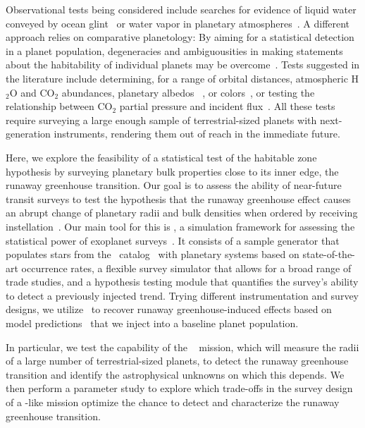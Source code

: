 \documentclass[twocolumn,twocolappendix]{aastex631}
\begin{document}
Observational tests being considered include searches for evidence of liquid water conveyed by ocean glint~\citep{Robinson2010,Lustig-Yaeger2018} or water vapor in planetary atmospheres~\citep{Suissa2020}.
A different approach relies on comparative planetology: By aiming for a statistical detection in a planet population, degeneracies and ambiguousities in making statements about the habitability of individual planets may be overcome~\citep{Checlair2019}.
Tests suggested in the literature include determining, for a range of orbital distances, atmospheric H$_{2}$O and CO$_2$ abundances, planetary albedos ~\citep{Bean2017,Bixel2021}, or colors~\citep{Crow2011}, or testing the relationship between CO$_2$ partial pressure and incident flux~\citep{Lehmer2020}.
All these tests require surveying a large enough sample of terrestrial-sized planets with next-generation instruments, rendering them out of reach in the immediate future.

Here, we explore the feasibility of a statistical test of the habitable zone hypothesis by surveying planetary bulk properties close to its inner edge, the runaway greenhouse transition.
Our goal is to assess the ability of near-future transit surveys to test the hypothesis that the runaway greenhouse effect causes an abrupt change of planetary radii and bulk densities when ordered by receiving instellation~\citep{Turbet2019}.
Our main tool for this is \bioverse, a simulation framework for assessing the statistical power of exoplanet surveys~\citep{Bixel2021}.
It consists of a sample generator that populates stars from the \gaia\ catalog~\citep{Gaia_mission,Gaia_DR3}  with planetary systems based on state-of-the-art occurrence rates, a flexible survey simulator that allows for a broad range of trade studies, and a hypothesis testing module that quantifies the survey's ability to detect a previously injected trend.
Trying different instrumentation and survey designs, we utilize \bioverse\ to recover runaway greenhouse-induced effects based on model predictions~\citep{Turbet2020,Dorn2021} that we inject into a baseline planet population.

In particular, we test the capability of the \plato\ \citep[PLAnetary Transits and Oscillation of stars, ][]{Rauer2016} mission, which will measure the radii of a large number of terrestrial-sized planets, to detect the runaway greenhouse transition and identify the astrophysical unknowns on which this depends.
We then perform a parameter study to explore which trade-offs in the survey design of a \plato-like mission optimize the chance to detect and characterize the runaway greenhouse transition.
\end{document}
